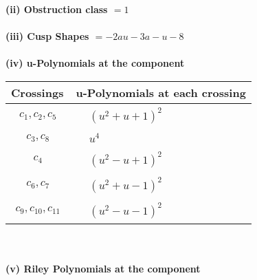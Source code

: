 \documentclass[1p]{elsarticle_modified}
\theoremstyle{definition}
\begin{document}
\flushleft \textbf{(ii) Obstruction class $= 1$}\\~\\
\flushleft \textbf{(iii) Cusp Shapes $= -2 a u-3 a- u-8$}\\~\\
\newpage\renewcommand{\arraystretch}{1}
\flushleft \textbf{(iv) u-Polynomials at the component}\newline \\
\begin{tabular}{m{50pt}|m{274pt}}
Crossings & \hspace{64pt}u-Polynomials at each crossing \\
\hline $$\begin{aligned}c_{1},c_{2},c_{5}\end{aligned}$$&$\begin{aligned}
&(u^2+u+1)^2
\end{aligned}$\\
\hline $$\begin{aligned}c_{3},c_{8}\end{aligned}$$&$\begin{aligned}
&u^4
\end{aligned}$\\
\hline $$\begin{aligned}c_{4}\end{aligned}$$&$\begin{aligned}
&(u^2- u+1)^2
\end{aligned}$\\
\hline $$\begin{aligned}c_{6},c_{7}\end{aligned}$$&$\begin{aligned}
&(u^2+u-1)^2
\end{aligned}$\\
\hline $$\begin{aligned}c_{9},c_{10},c_{11}\end{aligned}$$&$\begin{aligned}
&(u^2- u-1)^2
\end{aligned}$\\
\hline
\end{tabular}\\~\\
\newpage\renewcommand{\arraystretch}{1}
\flushleft \textbf{(v) Riley Polynomials at the component}\newline \\
\end{document}

